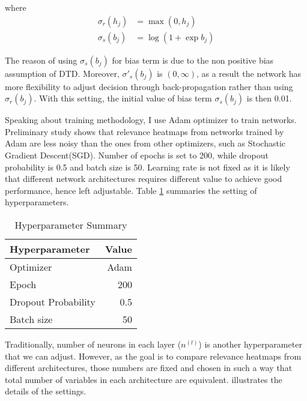 where
\begin{align*}
	\sigma_{r} (h_j) &= \max(0, h_j)  \tag{ReLU function}\\
	\sigma_{s} (b_j) &= \log(1+\exp b_j) \tag{Softplus function}
\end{align*}

The reason of using $\sigma_{s} (b_j)$ for bias term is due to the non positive bias assumption of DTD. Moreover, $\sigma'_{s} (b_j)$ is $(0, \infty)$, as a result the network has more flexibility to adjust decision through back-propagation rather than using $\sigma_{r} (b_j)$. With this setting, the initial value of bias term  $\sigma_{s}(b_j)$ is then 0.01.

Speaking about training methodology, I use Adam\cite{KingmaAdamMethodStochastic2014} optimizer to train networks. Preliminary study shows that relevance heatmaps from networks trained by Adam are less noisy than the ones from other optimizers, such as  Stochastic Gradient Descent(SGD). Number of epochs is set to 200, while dropout probability is 0.5 and batch size is 50.  
Learning rate is not fixed as it is likely that different network architectures requires different value to achieve good performance, hence left adjustable. Table \ref{tab:hyper_summary} summaries the setting of hyperparameters.

 
 \begin{table}[!htb]
\centering
\begin{tabular}{l|r}
\textbf{Hyperparameter} & \multicolumn{1}{l}{\textbf{Value}} \\ \hline
Optimizer               & Adam                               \\
Epoch     & 200                                \\
Dropout Probability     & 0.5                                \\
Batch size              & 50                                
\end{tabular}
\caption{Hyperparameter Summary}
\label{tab:hyper_summary}
\end{table}
 
Traditionally, number of neurons in each layer ($n^{(l)}$) is  another hyperparameter that we can adjust. However, as the goal is to compare relevance heatmaps from different architectures, those numbers are fixed and chosen in such a way that total number of variables in each architecture are equivalent. \addfigure{\ref{fig:neuron_numbers}} illustrates the details of the settings.

